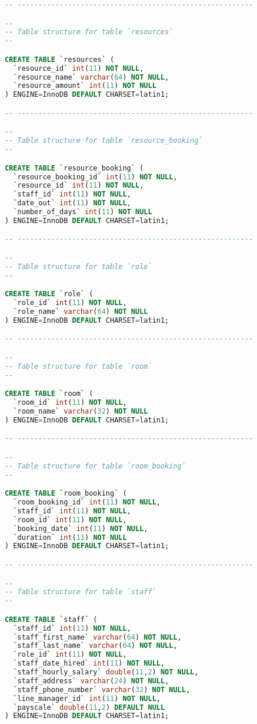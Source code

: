 \begin{lstlisting}[language=sql, caption=Database Generation Script, style=mystyle]
-- --------------------------------------------------------

--
-- Table structure for table `resources`
--

CREATE TABLE `resources` (
  `resource_id` int(11) NOT NULL,
  `resource_name` varchar(64) NOT NULL,
  `resource_amount` int(11) NOT NULL
) ENGINE=InnoDB DEFAULT CHARSET=latin1;

-- --------------------------------------------------------

--
-- Table structure for table `resource_booking`
--

CREATE TABLE `resource_booking` (
  `resource_booking_id` int(11) NOT NULL,
  `resource_id` int(11) NOT NULL,
  `staff_id` int(11) NOT NULL,
  `date_out` int(11) NOT NULL,
  `number_of_days` int(11) NOT NULL
) ENGINE=InnoDB DEFAULT CHARSET=latin1;

-- --------------------------------------------------------

--
-- Table structure for table `role`
--

CREATE TABLE `role` (
  `role_id` int(11) NOT NULL,
  `role_name` varchar(64) NOT NULL
) ENGINE=InnoDB DEFAULT CHARSET=latin1;

-- --------------------------------------------------------

--
-- Table structure for table `room`
--

CREATE TABLE `room` (
  `room_id` int(11) NOT NULL,
  `room_name` varchar(32) NOT NULL
) ENGINE=InnoDB DEFAULT CHARSET=latin1;

-- --------------------------------------------------------

--
-- Table structure for table `room_booking`
--

CREATE TABLE `room_booking` (
  `room_booking_id` int(11) NOT NULL,
  `staff_id` int(11) NOT NULL,
  `room_id` int(11) NOT NULL,
  `booking_date` int(11) NOT NULL,
  `duration` int(11) NOT NULL
) ENGINE=InnoDB DEFAULT CHARSET=latin1;

-- --------------------------------------------------------

--
-- Table structure for table `staff`
--

CREATE TABLE `staff` (
  `staff_id` int(11) NOT NULL,
  `staff_first_name` varchar(64) NOT NULL,
  `staff_last_name` varchar(64) NOT NULL,
  `role_id` int(11) NOT NULL,
  `staff_date_hired` int(11) NOT NULL,
  `staff_hourly_salary` double(11,2) NOT NULL,
  `staff_address` varchar(24) NOT NULL,
  `staff_phone_number` varchar(32) NOT NULL,
  `line_manager_id` int(11) NOT NULL,
  `payscale` double(11,2) DEFAULT NULL
) ENGINE=InnoDB DEFAULT CHARSET=latin1;


\end{lstlisting}
